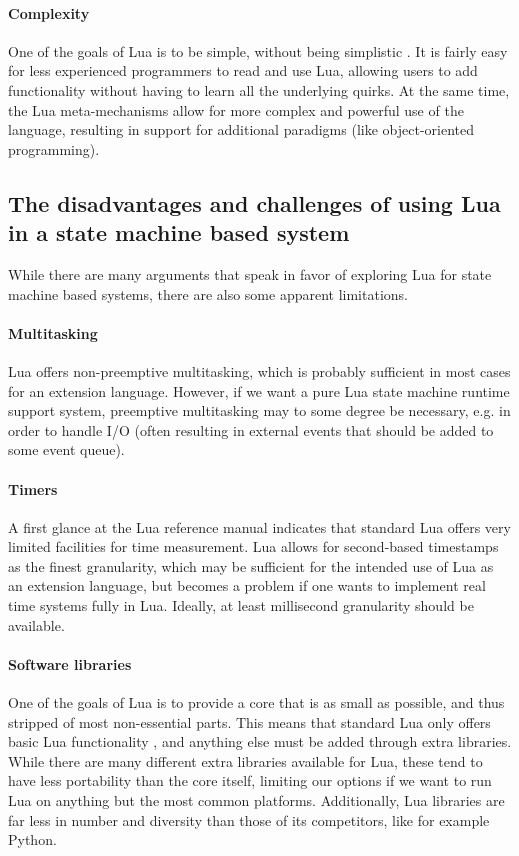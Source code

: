 \paragraph{Complexity}
One of the goals of Lua is to be simple, without being simplistic \cite{article:the_implementation_of_lua}. It is fairly easy for less experienced programmers to read and use Lua, allowing users to add functionality without having to learn all the underlying quirks. At the same time, the Lua meta-mechanisms allow for more complex and powerful use of the language, resulting in support for additional paradigms (like object-oriented programming).

\subsection{The disadvantages and challenges of using Lua in a state machine based system}
\label{sec:lua_disadvantages}
While there are many arguments that speak in favor of exploring Lua for state machine based systems, there are also some apparent limitations.

\paragraph{Multitasking}
Lua offers non-preemptive multitasking, which is probably sufficient in most cases for an extension language. However, if we want a pure Lua state machine runtime support system, preemptive multitasking may to some degree be necessary, e.g. in order to handle I/O (often resulting in external events that should be added to some event queue).

\paragraph{Timers}
A first glance at the Lua reference manual indicates that standard Lua offers very limited facilities for time measurement. Lua allows for second-based timestamps as the finest granularity, which may be sufficient for the intended use of Lua as an extension language, but becomes a problem if one wants to implement real time systems fully in Lua. Ideally, at least millisecond granularity should be available.

\paragraph{Software libraries}
One of the goals of Lua is to provide a core that is as small as possible, and thus stripped of most non-essential parts. This means that standard Lua only offers basic Lua functionality \cite[ch. 6]{book:lua_reference_manual}, and anything else must be added through extra libraries. While there are many different extra libraries available for Lua, these tend to have less portability than the core itself, limiting our options if we want to run Lua on anything but the most common platforms. Additionally, Lua libraries are far less in number and diversity than those of its competitors, like for example Python.

